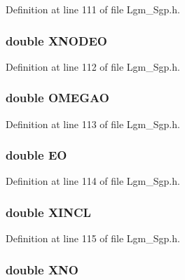 Definition at line 111 of file Lgm\_\-Sgp.h.\hypertarget{struct___sgp_info_19011c821f658fe3d9eb170b9a7d505d}{
\subsubsection[{XNODEO}]{\setlength{\rightskip}{0pt plus 5cm}double {\bf XNODEO}}}
\label{struct___sgp_info_19011c821f658fe3d9eb170b9a7d505d}




Definition at line 112 of file Lgm\_\-Sgp.h.\hypertarget{struct___sgp_info_06f0e6ec3e46d144a3fc90417308816e}{
\subsubsection[{OMEGAO}]{\setlength{\rightskip}{0pt plus 5cm}double {\bf OMEGAO}}}
\label{struct___sgp_info_06f0e6ec3e46d144a3fc90417308816e}




Definition at line 113 of file Lgm\_\-Sgp.h.\hypertarget{struct___sgp_info_c3b3a39803395c18d0919adaef671344}{
\subsubsection[{EO}]{\setlength{\rightskip}{0pt plus 5cm}double {\bf EO}}}
\label{struct___sgp_info_c3b3a39803395c18d0919adaef671344}




Definition at line 114 of file Lgm\_\-Sgp.h.\hypertarget{struct___sgp_info_f3ee830bb3dfcd5873b48ac804fcfcfc}{
\subsubsection[{XINCL}]{\setlength{\rightskip}{0pt plus 5cm}double {\bf XINCL}}}
\label{struct___sgp_info_f3ee830bb3dfcd5873b48ac804fcfcfc}




Definition at line 115 of file Lgm\_\-Sgp.h.\hypertarget{struct___sgp_info_3a911c89d654142a00f0502b3ff5ccae}{
\subsubsection[{XNO}]{\setlength{\rightskip}{0pt plus 5cm}double {\bf XNO}}}
\label{struct___sgp_info_3a911c89d654142a00f0502b3ff5ccae}




